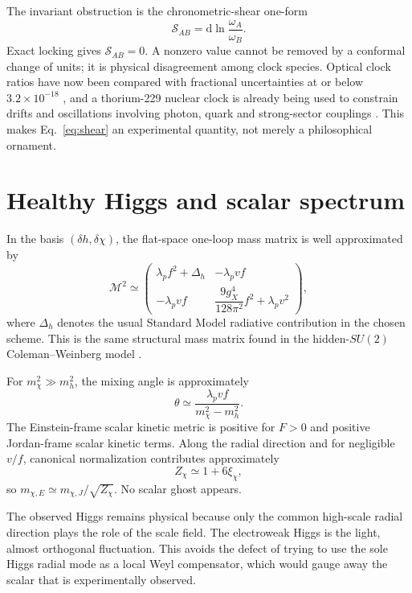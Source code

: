 \documentclass[11pt,a4paper]{article}
\newcommand{\dd}{\mathrm{d}}
\newcommand{\M}{\mathcal{M}}
\begin{document}
The invariant obstruction is the chronometric-shear one-form
\begin{equation}
\boxed{
\mathcal S_{AB}=\dd\ln\frac{\omega_A}{\omega_B}.
}
\label{eq:shear}
\end{equation}
Exact locking gives $\mathcal S_{AB}=0$. A nonzero value cannot be removed by a conformal change of units; it is physical disagreement among clock species. Optical clock ratios have now been compared with fractional uncertainties at or below $3.2\times10^{-18}$ \cite{Aeppli2025}, and a thorium-229 nuclear clock is already being used to constrain drifts and oscillations involving photon, quark and strong-sector couplings \cite{Thorium2026}. This makes Eq.~\eqref{eq:shear} an experimental quantity, not merely a philosophical ornament.

\section{Healthy Higgs and scalar spectrum}

In the basis $(\delta h,\delta\chi)$, the flat-space one-loop mass matrix is well approximated by
\begin{equation}
\M^2\simeq
\begin{pmatrix}
\lambda_p f^2+\Delta_h & -\lambda_pvf\\
-\lambda_pvf & \dfrac{9g_X^4}{128\pi^2}f^2+\lambda_pv^2
\end{pmatrix},
\label{eq:massmatrix}
\end{equation}
where $\Delta_h$ denotes the usual Standard Model radiative contribution in the chosen scheme. This is the same structural mass matrix found in the hidden-$SU(2)$ Coleman--Weinberg model \cite{CaroneRamos2013}.

For $m_\chi^2\gg m_h^2$, the mixing angle is approximately
\begin{equation}
\theta\simeq\frac{\lambda_pvf}{m_\chi^2-m_h^2}.
\label{eq:mixing}
\end{equation}
The Einstein-frame scalar kinetic metric is positive for $F>0$ and positive Jordan-frame scalar kinetic terms. Along the radial direction and for negligible $v/f$, canonical normalization contributes approximately
\[
Z_\chi\simeq1+6\xi_\chi,
\]
so $m_{\chi,E}\simeq m_{\chi,J}/\sqrt{Z_\chi}$. No scalar ghost appears.

The observed Higgs remains physical because only the common high-scale radial direction plays the role of the scale field. The electroweak Higgs is the light, almost orthogonal fluctuation. This avoids the defect of trying to use the sole Higgs radial mode as a local Weyl compensator, which would gauge away the scalar that is experimentally observed.
\end{document}
